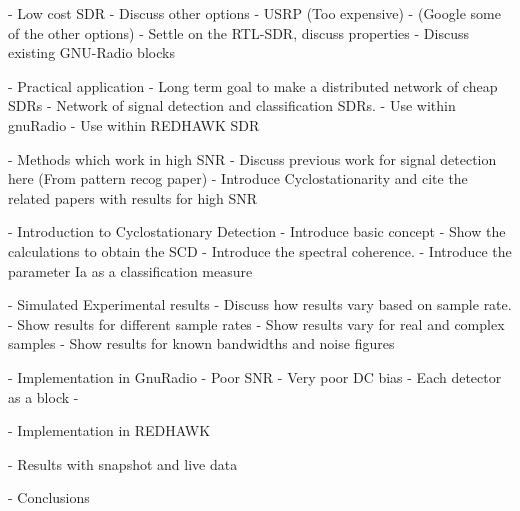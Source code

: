

 - Low cost SDR
 	- Discuss other options
 	- USRP (Too expensive)
 	- (Google some of the other options)
 	- Settle on the RTL-SDR, discuss properties
 	- Discuss existing GNU-Radio blocks
 
 - Practical application
	- Long term goal to make a distributed network of cheap SDRs
	- Network of signal detection and classification SDRs.
	- Use within gnuRadio
	- Use within REDHAWK SDR
   
 - Methods which work in high SNR
 	- Discuss previous work for signal detection here (From pattern recog paper)
 	- Introduce Cyclostationarity and cite the related papers with results for high
 	SNR
 
 - Introduction to Cyclostationary Detection
 	- Introduce basic concept
 	- Show the calculations to obtain the SCD
 	- Introduce the spectral coherence.
 	- Introduce the parameter Ia as a classification measure
 
 - Simulated Experimental results
 	- Discuss how results vary based on sample rate.
 	- Show results for different sample rates
 	- Show results vary for real and complex samples
 	- Show results for known bandwidths and noise figures
 	
 - Implementation in GnuRadio
 	- Poor SNR
 	- Very poor DC bias
 	-  Each detector as a block
 	- 

 - Implementation in REDHAWK
 
 - Results with snapshot and live data
 
 - Conclusions
